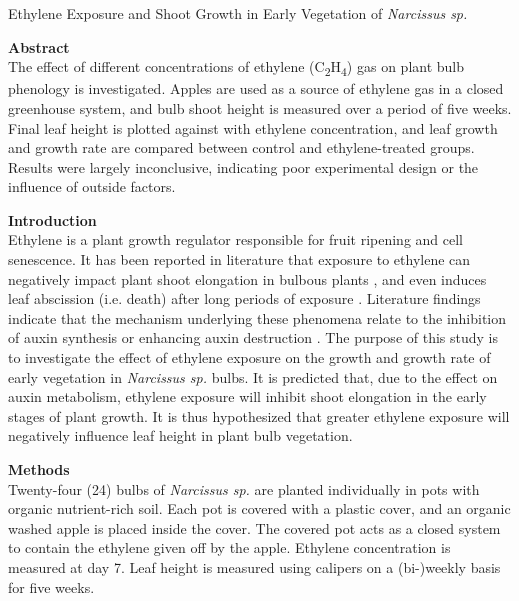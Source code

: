 \documentclass{report}
\begin{document}
\begin{center}
  \LARGE
  Ethylene Exposure and Shoot Growth in Early Vegetation of \textit{Narcissus sp.}
\end{center}

\medskip

\begin{multicols}{3}

  \textbf{Abstract}\\
  The effect of different concentrations of ethylene (C\textsubscript{2}H\textsubscript{4}) gas on plant bulb phenology is investigated.
  Apples are used as a source of ethylene gas in a closed greenhouse system, and bulb shoot height is measured over a period of five weeks.
  Final leaf height is plotted against with ethylene concentration, and leaf growth and growth rate are compared between control and ethylene-treated groups.
  Results were largely inconclusive, indicating poor experimental design or the influence of outside factors.
  
  \textbf{Introduction}\\
  Ethylene is a plant growth regulator responsible for fruit ripening and cell senescence.
  It has been reported in literature that exposure to ethylene can negatively impact plant shoot elongation in bulbous plants \parencite{bulbous}, and even induces leaf abscission (i.e. death) after long periods of exposure \parencite{abscission}.
  Literature findings indicate that the mechanism underlying these phenomena relate to the inhibition of auxin synthesis or enhancing auxin destruction \parencite{senescence}.
  The purpose of this study is to investigate the effect of ethylene exposure on the growth and growth rate of early vegetation in \textit{Narcissus sp.} bulbs.
  It is predicted that, due to the effect on auxin metabolism, ethylene exposure will inhibit shoot elongation in the early stages of plant growth.
  It is thus hypothesized that greater ethylene exposure will negatively influence leaf height in plant bulb vegetation.

  \vfill\null
  \columnbreak
  
  \textbf{Methods}\\
  Twenty-four (24) bulbs of \textit{Narcissus sp.} are planted individually in pots with organic nutrient-rich soil.
  Each pot is covered with a plastic cover, and an organic washed apple is placed inside the cover.
  The covered pot acts as a closed system to contain the ethylene given off by the apple.
  Ethylene concentration is measured at day 7.
  Leaf height is measured using calipers on a (bi-)weekly basis for five weeks.


\end{multicols}
\end{document}
